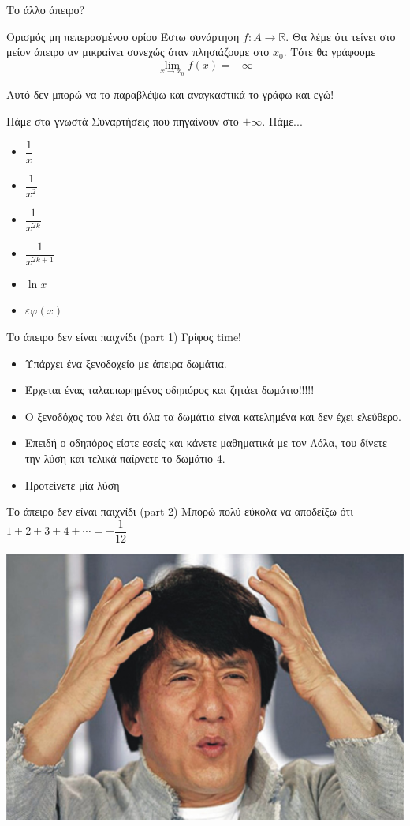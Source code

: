\documentclass{presentation}
\begin{document}
\begin{frame}{Το άλλο άπειρο?}
  \begin{block}{Ορισμός μη πεπερασμένου ορίου}
    Έστω συνάρτηση $f:Α\to\mathbb{R}$. Θα λέμε ότι τείνει στο μείον άπειρο αν μικραίνει συνεχώς όταν πλησιάζουμε στο $x_0$. Τότε θα γράφουμε
    $$\lim\limits_{x \to x_0}{ f(x) }=-\infty$$
  \end{block} \pause
  Αυτό δεν μπορώ να το παραβλέψω και αναγκαστικά το γράφω και εγώ!
\end{frame}

\begin{frame}{Πάμε στα γνωστά}
  Συναρτήσεις που πηγαίνουν στο $+\infty$. \pause Πάμε... \pause
  \begin{itemize}
    \item $\dfrac{1}{x}$
    \item $\dfrac{1}{x^2}$
    \item $\dfrac{1}{x^{2k}}$
    \item $\dfrac{1}{x^{2k+1}}$
    \item $\ln{x}$
    \item $εφ(x)$
  \end{itemize}
\end{frame}

\begin{frame}{Το άπειρο δεν είναι παιχνίδι (part 1)}
  Γρίφος time!
  \begin{itemize}
    \item Υπάρχει ένα ξενοδοχείο με άπειρα δωμάτια.
    \item Έρχεται ένας ταλαιπωρημένος οδηπόρος και ζητάει δωμάτιο!!!!!
    \item Ο ξενοδόχος του λέει ότι όλα τα δωμάτια είναι κατελημένα και δεν έχει ελεύθερο.
    \item Επειδή ο οδηπόρος είστε εσείς και κάνετε μαθηματικά με τον Λόλα, του δίνετε την λύση και τελικά παίρνετε το δωμάτιο 4.
    \item Προτείνετε μία λύση
  \end{itemize}
\end{frame}

\begin{frame}{Το άπειρο δεν είναι παιχνίδι (part 2)}
  Μπορώ πολύ εύκολα να αποδείξω ότι $1+2+3+4+\cdots = -\dfrac{1}{12}$

  \centering
  \includegraphics[height=0.4\columnwidth]{images/qiev6}
\end{frame}
\end{document}
